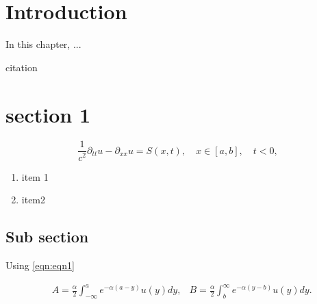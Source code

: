 
\section{Introduction}
\label{chap2_intro}
 In this chapter, ... 

citation 
\cite{Thavam2017,7534052}  

\section{section 1}
\label{sec:sec1}

\begin{equation}
    \label{eqn:eqn1} 
    \frac{1}{c^2}\partial_{tt} u - \partial_{xx} u = S(x, t) , \quad x \in [a, b], \quad t < 0,    
\end{equation}

\begin{enumerate}
    \item item 1
    \item item2
\end{enumerate}

\subsection{Sub section}

Using \eqref{eqn:eqn1} 


\begin{align}
	\label{eqn:bdry_coeff_int}
	&A = \frac{\alpha}{2} \int_{-\infty}^a e^{-\alpha(a-y)}u(y)dy,
	&B = \frac{\alpha}{2}  \int_b^{\infty} e^{-\alpha(y-b)}u(y)dy.
\end{align}

